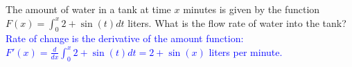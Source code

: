 \documentclass{ximera}
\begin{document}
\begin{exercise}
    The amount of water in a tank at time $x$ minutes is given by the function $F(x)=\int_0^x 2+\sin(t)dt$ liters.  What is the flow rate of water into the tank? \\
    \textcolor{blue}{Rate of change is the derivative of the amount function: $F'(x)=\frac{d}{dx}\int_0^x 2+\sin(t)dt=2+\sin(x)$ liters per minute.}
\end{exercise}
\end{document}

